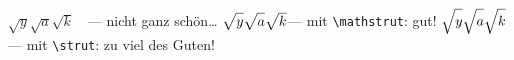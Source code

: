 

	$\sqrt{y}\sqrt{a}\sqrt{k}$	\ \,--- nicht ganz schön\dots
	$\sqrt{\mathstrut y} \sqrt{\mathstrut a} \sqrt{\mathstrut k}$--- mit \texttt{\textbackslash mathstrut}: gut!
	$\sqrt{\strut y} \sqrt{\strut a} \sqrt{\strut k}$--- mit \texttt{\textbackslash strut}: zu viel des Guten!

